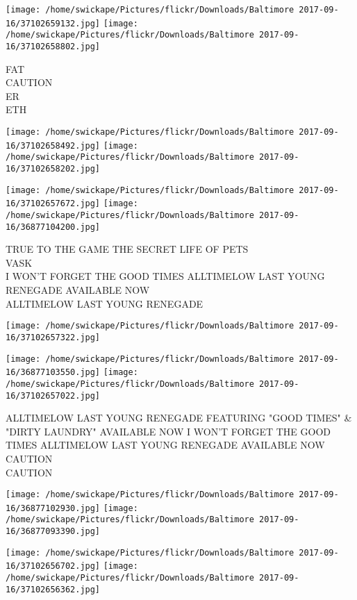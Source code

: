 \documentclass[10pt,letterpaper]{article}
\begin{document}
\texttt{[image: /home/swickape/Pictures/flickr/Downloads/Baltimore 2017-09-16/37102659132.jpg]}
\texttt{[image: /home/swickape/Pictures/flickr/Downloads/Baltimore 2017-09-16/37102658802.jpg]}

FAT\\
CAUTION\\
ER\\
ETH
\pagebreak

\texttt{[image: /home/swickape/Pictures/flickr/Downloads/Baltimore 2017-09-16/37102658492.jpg]}
\texttt{[image: /home/swickape/Pictures/flickr/Downloads/Baltimore 2017-09-16/37102658202.jpg]}

\texttt{[image: /home/swickape/Pictures/flickr/Downloads/Baltimore 2017-09-16/37102657672.jpg]}
\texttt{[image: /home/swickape/Pictures/flickr/Downloads/Baltimore 2017-09-16/36877104200.jpg]}

TRUE TO THE GAME THE SECRET LIFE OF PETS\\
VASK\\
I WON'T FORGET THE GOOD TIMES ALLTIMELOW LAST YOUNG RENEGADE AVAILABLE NOW\\
ALLTIMELOW LAST YOUNG RENEGADE
\pagebreak

\texttt{[image: /home/swickape/Pictures/flickr/Downloads/Baltimore 2017-09-16/37102657322.jpg]}

\vspace{0.25in}
\texttt{[image: /home/swickape/Pictures/flickr/Downloads/Baltimore 2017-09-16/36877103550.jpg]}
\texttt{[image: /home/swickape/Pictures/flickr/Downloads/Baltimore 2017-09-16/37102657022.jpg]}

ALLTIMELOW LAST YOUNG RENEGADE FEATURING "GOOD TIMES" \& "DIRTY LAUNDRY" AVAILABLE NOW I WON'T FORGET THE GOOD TIMES ALLTIMELOW LAST YOUNG RENEGADE AVAILABLE NOW\\
CAUTION\\
CAUTION
\pagebreak

\texttt{[image: /home/swickape/Pictures/flickr/Downloads/Baltimore 2017-09-16/36877102930.jpg]}
\texttt{[image: /home/swickape/Pictures/flickr/Downloads/Baltimore 2017-09-16/36877093390.jpg]}

\texttt{[image: /home/swickape/Pictures/flickr/Downloads/Baltimore 2017-09-16/37102656702.jpg]}
\texttt{[image: /home/swickape/Pictures/flickr/Downloads/Baltimore 2017-09-16/37102656362.jpg]}
\end{document}
